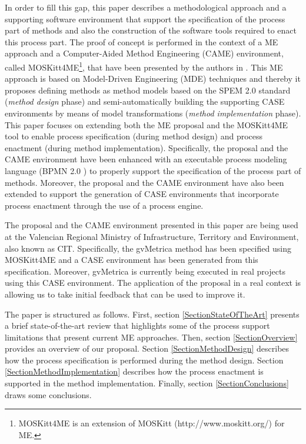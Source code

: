 \documentclass[runningheads,a4paper]{llncs}
\begin{document}
In order to fill this gap, this paper describes a methodological approach and a
supporting software environment that support the specification of the process
part of methods and also the construction of the software tools required to
enact this process part. The proof of concept is performed in the context of a
ME approach and a Computer-Aided Method Engineering (CAME) environment, called
MOSKitt4ME\footnote{MOSKitt4ME is an extension of MOSKitt
(http://www.moskitt.org/) for ME.}, that have been presented by the authors in
\cite{Cervera10,Cervera11}. This ME approach is based on Model-Driven
Engineering (MDE) techniques and thereby it proposes defining methods as method
models based on the SPEM 2.0 standard \cite{spem} (\textit{method design} phase)
and semi-automatically building the supporting CASE environments by means of
model transformations (\textit{method implementation} phase). This paper focuses
on extending both the ME proposal and the MOSKitt4ME tool to enable process
specification (during method design) and process enactment (during method
implementation). Specifically, the proposal and the CAME environment have been
enhanced with an executable process modeling language (BPMN 2.0 \cite{bpmn}) to
properly support the specification of the process part of methods. Moreover, the
proposal and the CAME environment have also been extended to support the
generation of CASE environments that incorporate process enactment through the
use of a process engine.

The proposal and the CAME environment presented in this paper are being used at
the Valencian Regional Ministry of Infrastructure, Territory and Environment,
also known as CIT. Specifically, the gvMetrica method has been specified using
MOSKitt4ME and a CASE environment has been generated from this specification.
Moreover, gvMetrica is currently being executed in real projects using this CASE
environment. The application of the proposal in a real context is allowing us to
take initial feedback that can be used to improve it.

The paper is structured as follows. First, section \ref{SectionStateOfTheArt}
presents a brief state-of-the-art review that highlights some of the process
support limitations that present current ME approaches. Then, section
\ref{SectionOverview} provides an overview of our proposal. Section
\ref{SectionMethodDesign} describes how the process specification is performed
during the method design. Section \ref{SectionMethodImplementation} describes
how the process enactment is supported in the method implementation. Finally,
section \ref{SectionConclusions} draws some conclusions.
\end{document}

